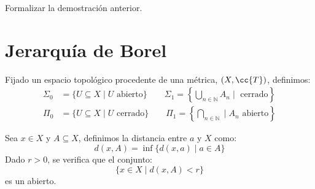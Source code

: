 \begin{ejercicio}
    Formalizar la demostración anterior.
\end{ejercicio}

\section{Jerarquía de Borel}
Fijado un espacio topológico procedente de una métrica, $(X,\cc{T})$, definimos:
\begin{align*}
    \Sigma_0 &= \{U\subseteq X \mid U \text{\ abierto}\} \qquad \Sigma_1 = \left\{\bigcup_{n\in \mathbb{N}} A_n \mid \text{\ cerrado}\right\} \\
    \Pi_0 &= \{U\subseteq X \mid U \text{\ cerrado}\} \qquad \Pi_1 = \left\{\bigcap_{n\in \mathbb{N}} \mid A_n \text{\ abierto}\right\}
\end{align*}

\begin{ejercicio}
    Sea $x\in X$ y $A\subseteq X$, definimos la distancia entre $a$ y $X$ como:
    \begin{equation*}
        d(x,A) = \inf\{d(x,a) \mid a\in A\}
    \end{equation*}
    Dado $r>0$, se verifica que el conjunto:
    \begin{equation*}
        \{x\in X\mid d(x,A) < r\}
    \end{equation*}
    es un abierto.
\end{ejercicio}

